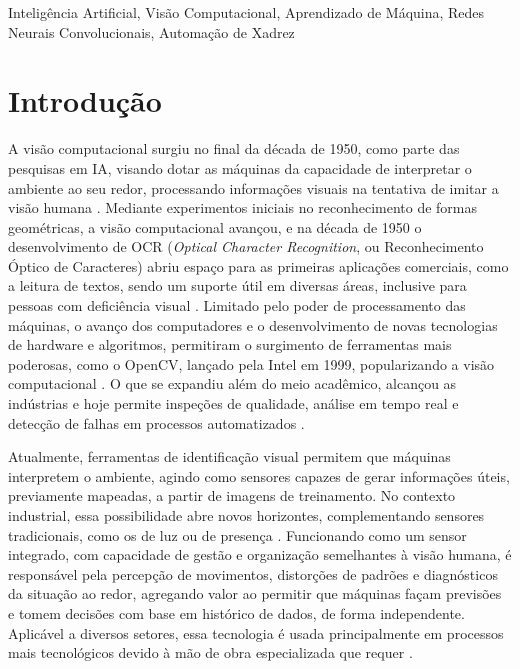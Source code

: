 \documentclass[journal]{IEEEtran} %
\begin{document}
\begin{IEEEkeywords}
Inteligência Artificial,
Visão Computacional,
Aprendizado de Máquina,
Redes Neurais Convolucionais,
Automação de Xadrez
\end{IEEEkeywords}

\section{Introdução}

A visão computacional surgiu no final da década de 1950, como parte das pesquisas em IA, visando dotar as máquinas da capacidade de interpretar o ambiente ao seu redor, processando informações visuais na tentativa de imitar a visão humana \cite{jesus2022visao}. Mediante experimentos iniciais no reconhecimento de formas geométricas, a visão computacional avançou, e na década de 1950 o desenvolvimento de OCR (\textit{Optical Character Recognition}, ou Reconhecimento Óptico de Caracteres) abriu espaço para as primeiras aplicações comerciais, como a leitura de textos, sendo um suporte útil em diversas áreas, inclusive para pessoas com deficiência visual \cite{jesus2022visao}. Limitado pelo poder de processamento das máquinas, o avanço dos computadores e o desenvolvimento de novas tecnologias de hardware e algoritmos, permitiram o surgimento de ferramentas mais poderosas, como o OpenCV, lançado pela Intel em 1999, popularizando a visão computacional \cite{techopedia2024}. O que se expandiu além do meio acadêmico, alcançou as indústrias e hoje permite inspeções de qualidade, análise em tempo real e detecção de falhas em processos automatizados \cite{siderurgia_visao_computacional}.

Atualmente, ferramentas de identificação visual permitem que máquinas interpretem o ambiente, agindo como sensores capazes de gerar informações úteis, previamente mapeadas, a partir de imagens de treinamento. No contexto industrial, essa possibilidade abre novos horizontes, complementando sensores tradicionais, como os de luz ou de presença \cite{sidi2024}. Funcionando como um sensor integrado, com capacidade de gestão e organização semelhantes à visão humana, é responsável pela percepção de movimentos, distorções de padrões e diagnósticos da situação ao redor, agregando valor ao permitir que máquinas façam previsões e tomem decisões com base em histórico de dados, de forma independente. Aplicável a diversos setores, essa tecnologia é usada principalmente em processos mais tecnológicos devido à mão de obra especializada que requer \cite{makewise2024}.
\end{document}
